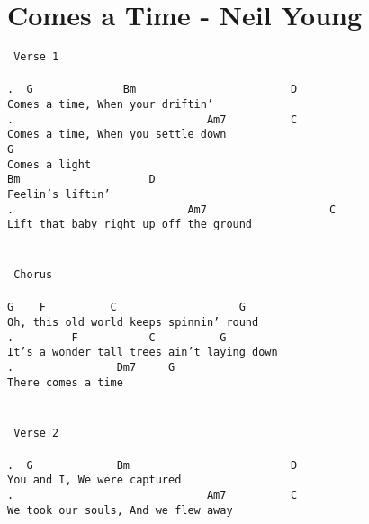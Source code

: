 \newpage
\section{Comes a Time - Neil Young}
\label{Comes a Time - Neil Young}
\texttt{\lbrack\ Verse\ 1\rbrack\\
\\
.\ \ G\ \ \ \ \ \ \ \ \ \ \ \ \ \ Bm\ \ \ \ \ \ \ \ \ \ \ \ \ \ \ \ \ \ \ \ \ \ \ \ D\\
Comes\ a\ time,\ When\ your\ driftin'\\
.\ \ \ \ \ \ \ \ \ \ \ \ \ \ \ \ \ \ \ \ \ \ \ \ \ \ \ \ \ \ Am7\ \ \ \ \ \ \ \ \ \ C\\
Comes\ a\ time,\ When\ you\ settle\ down\\
G\\
Comes\ a\ light\\
Bm\ \ \ \ \ \ \ \ \ \ \ \ \ \ \ \ \ \ \ \ D\\
Feelin's\ liftin'\\
.\ \ \ \ \ \ \ \ \ \ \ \ \ \ \ \ \ \ \ \ \ \ \ \ \ \ \ Am7\ \ \ \ \ \ \ \ \ \ \ \ \ \ \ \ \ \ \ C\\
Lift\ that\ baby\ right\ up\ off\ the\ ground\\
\\
\\
\lbrack\ Chorus\rbrack\\
\\
G\ \ \ \ F\ \ \ \ \ \ \ \ \ \ C\ \ \ \ \ \ \ \ \ \ \ \ \ \ \ \ \ \ \ G\\
Oh,\ this\ old\ world\ keeps\ spinnin'\ round\ \\
.\ \ \ \ \ \ \ \ \ F\ \ \ \ \ \ \ \ \ \ \ C\ \ \ \ \ \ \ \ \ \ G\\
It's\ a\ wonder\ tall\ trees\ ain't\ laying\ down\\
.\ \ \ \ \ \ \ \ \ \ \ \ \ \ \ \ Dm7\ \ \ \ \ G\\
There\ comes\ a\ time\\
\\
\\
\lbrack\ Verse\ 2\rbrack\\
\\
.\ \ G\ \ \ \ \ \ \ \ \ \ \ \ \ Bm\ \ \ \ \ \ \ \ \ \ \ \ \ \ \ \ \ \ \ \ \ \ \ \ \ D\\
You\ and\ I,\ We\ were\ captured\\
.\ \ \ \ \ \ \ \ \ \ \ \ \ \ \ \ \ \ \ \ \ \ \ \ \ \ \ \ \ \ Am7\ \ \ \ \ \ \ \ \ \ C\\
We\ took\ our\ souls,\ And\ we\ flew\ away\\
}
